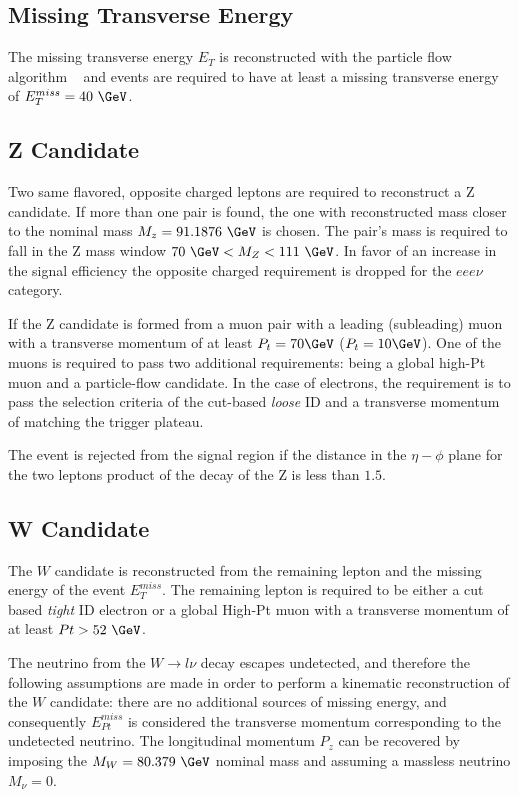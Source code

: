 \subsection{Missing Transverse Energy}

The missing transverse energy $E_T$ is reconstructed with the particle flow
algorithm ~\cite{particleflow} and events are required to have at least a
missing transverse energy of $E_T^{miss}=40~\GeV$.

\subsection{Z Candidate}

Two same flavored, opposite charged leptons are required to reconstruct a Z
candidate. If more than one pair is found, the one with reconstructed mass
closer to the nominal mass $M_z=91.1876~\GeV$ is chosen. The pair's mass
is required to fall in the Z mass window $70~\GeV < M_Z < 111~\GeV$. In favor of an
increase in the signal efficiency the opposite charged requirement is dropped
for the $eee\nu$ category.

If the Z candidate is formed from a muon pair with a leading (subleading) muon with
a transverse momentum of at least $P_t=70 \GeV$ ($P_t=10\GeV$). One of the
muons is required to pass two additional requirements: being a global high-Pt muon and a
particle-flow candidate. In the case of electrons, the requirement is to pass the
selection criteria of the cut-based \emph{loose} ID and a transverse momentum of
matching the trigger plateau.

The event is rejected from the signal region if the distance in the $\eta-\phi$
plane for the two leptons product of the decay of the Z is less than $1.5$.

\subsection{W Candidate}

The $W$ candidate is reconstructed from the remaining lepton and the missing energy
of the event $E_T^{miss}$. The remaining lepton is required to be either a cut based \emph{tight}
ID electron or a global High-Pt muon with a transverse momentum
of at least $Pt>52~\GeV$.

The neutrino from the $W \rightarrow l\nu$ decay escapes undetected,
and therefore the following assumptions are made in order to perform a kinematic
reconstruction of the $W$ candidate: there are no additional sources of missing
energy, and consequently $E_{Pt}^{miss}$ is considered the transverse momentum
corresponding to the undetected neutrino. The longitudinal momentum $P_z$ can be
recovered by imposing the $M_W=80.379~\GeV $ nominal mass and assuming
a massless neutrino $M_\nu = 0.$

